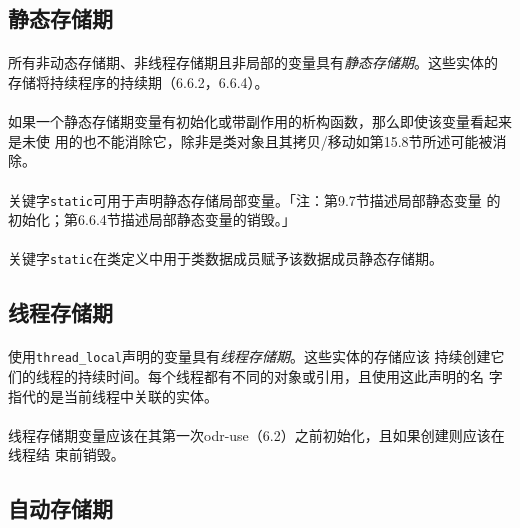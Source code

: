 \subsection{静态存储期}

\paragraph{}
所有非动态存储期、非线程存储期且非局部的变量具有\textit{静态存储期}。这些实体的
存储将持续程序的持续期（6.6.2，6.6.4）。

\paragraph{}
如果一个静态存储期变量有初始化或带副作用的析构函数，那么即使该变量看起来是未使
用的也不能消除它，除非是类对象且其拷贝/移动如第15.8节所述可能被消除。

\paragraph{}
关键字\texttt{static}可用于声明静态存储局部变量。「注：第9.7节描述局部静态变量
的初始化；第6.6.4节描述局部静态变量的销毁。」

\paragraph{}
关键字\texttt{static}在类定义中用于类数据成员赋予该数据成员静态存储期。

\subsection{线程存储期}
\paragraph{}
使用\texttt{thread\_local}声明的变量具有\textit{线程存储期}。这些实体的存储应该
持续创建它们的线程的持续时间。每个线程都有不同的对象或引用，且使用这此声明的名
字指代的是当前线程中关联的实体。

\paragraph{}
线程存储期变量应该在其第一次odr-use（6.2）之前初始化，且如果创建则应该在线程结
束前销毁。

\subsection{自动存储期}
